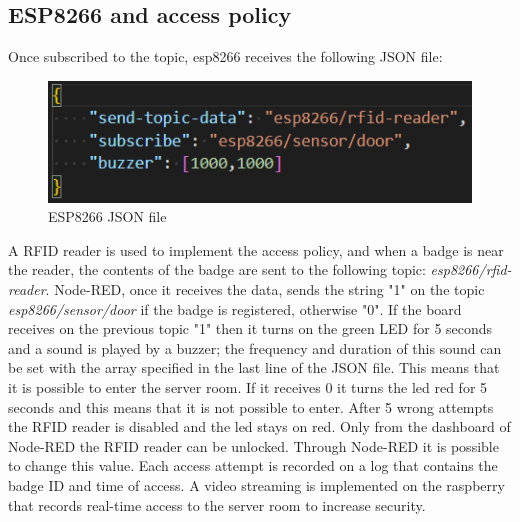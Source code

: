 \documentclass[]{scrartcl}
\begin{document}
\subsection{ESP8266 and access policy}
Once subscribed to the topic, esp8266 receives the following JSON file:
\begin{figure}[h!]
	\centering
	\includegraphics[width=\textwidth]{esp8266-config.png}
	\caption{ESP8266 JSON file}
\end{figure}
\newpage \noindent
A RFID reader is used to implement the access policy, and when a badge is near the reader, the contents of the badge are sent to the following topic: \textit{esp8266/rfid-reader}. Node-RED, once it receives the data, sends the string "1" on the topic \textit{esp8266/sensor/door} if the badge is registered, otherwise "0". If the board receives on the previous topic "1" then it turns on the green LED for 5 seconds and a sound is played by a buzzer; the frequency and duration of this sound can be set with the array specified in the last line of the JSON file. This means that it is possible to enter the server room. If it receives 0 it turns the led red for 5 seconds and this means that it is not possible to enter. After 5 wrong attempts the RFID reader is disabled and the led stays on red. Only from the dashboard of Node-RED the RFID reader can be unlocked. Through Node-RED it is possible to change this value. Each access attempt is recorded on a log that contains the badge ID and time of access.
\newline \newline \noindent
A video streaming is implemented on the raspberry that records real-time access to the server room to increase security.
\end{document}

